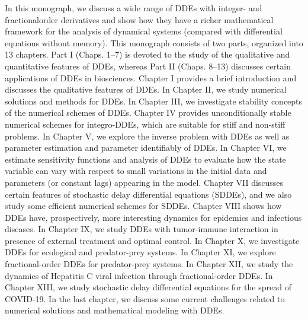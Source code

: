 \documentclass[12pt]{article}
\begin{document}
In this monograph, we discuss a wide range of DDEs with integer- and fractionalorder derivatives and show how they have a richer mathematical 
framework for the analysis of dynamical systems (compared with differential equations without memory). This monograph consists of two parts, 
organized into 13 chapters. Part I (Chaps. 1–7) is devoted to the study of the qualitative and quantitative features of DDEs, whereas Part II 
(Chaps. 8–13) discusses certain applications of DDEs in biosciences. Chapter I provides a brief introduction and discusses the qualitative 
features of DDEs. In Chapter II, we study numerical solutions and methods for DDEs. In Chapter III, we investigate stability concepts of the 
numerical schemes of DDEs. Chapter IV provides unconditionally stable numerical schemes for integro-DDEs, which are suitable for stiff and 
non-stiff problems. In Chapter V, we explore the inverse problem with DDEs as well as parameter estimation and parameter identifiably of 
DDEs. In Chapter VI, we estimate sensitivity functions and analysis of DDEs to evaluate how the state variable can vary with respect to small 
variations in the initial data and parameters (or constant lags) appearing in the model. Chapter VII discusses certain features of stochastic 
delay differential equations (SDDEs), and we also study some efficient numerical schemes for SDDEs. Chapter VIII shows how DDEs have, 
prospectively, more interesting dynamics for epidemics and infectious diseases. In Chapter IX, we study DDEs with tumor-immune interaction in 
presence of external treatment and optimal control. In Chapter X, we investigate DDEs for ecological and predator-prey systems. In Chapter 
XI, we explore fractional-order DDEs for predator-prey systems. In Chapter XII, we study the dynamics of Hepatitis C viral infection through 
fractional-order DDEs. In Chapter XIII, we study stochastic delay differential equations for the spread of COVID-19. In the last chapter, we 
discuss some current challenges related to numerical solutions and mathematical modeling with DDEs.
\end{document}
